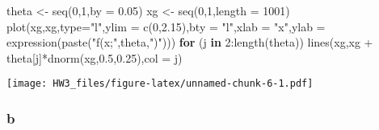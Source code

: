 \documentclass[
]{article}
\newenvironment{Shaded}{\begin{snugshade}}{\end{snugshade}}
\newcommand{\AttributeTok}[1]{\textcolor[rgb]{0.77,0.63,0.00}{#1}}
\newcommand{\ControlFlowTok}[1]{\textcolor[rgb]{0.13,0.29,0.53}{\textbf{#1}}}
\newcommand{\DecValTok}[1]{\textcolor[rgb]{0.00,0.00,0.81}{#1}}
\newcommand{\FloatTok}[1]{\textcolor[rgb]{0.00,0.00,0.81}{#1}}
\newcommand{\FunctionTok}[1]{\textcolor[rgb]{0.00,0.00,0.00}{#1}}
\newcommand{\NormalTok}[1]{#1}
\newcommand{\OtherTok}[1]{\textcolor[rgb]{0.56,0.35,0.01}{#1}}
\newcommand{\SpecialCharTok}[1]{\textcolor[rgb]{0.00,0.00,0.00}{#1}}
\newcommand{\StringTok}[1]{\textcolor[rgb]{0.31,0.60,0.02}{#1}}
\begin{document}
\begin{Shaded}
\begin{Highlighting}[]
\NormalTok{theta }\OtherTok{\textless{}{-}} \FunctionTok{seq}\NormalTok{(}\DecValTok{0}\NormalTok{,}\DecValTok{1}\NormalTok{,}\AttributeTok{by =} \FloatTok{0.05}\NormalTok{)}
\NormalTok{xg }\OtherTok{\textless{}{-}} \FunctionTok{seq}\NormalTok{(}\DecValTok{0}\NormalTok{,}\DecValTok{1}\NormalTok{,}\AttributeTok{length =} \DecValTok{1001}\NormalTok{)}
\FunctionTok{plot}\NormalTok{(xg,xg,}\AttributeTok{type=}\StringTok{"l"}\NormalTok{,}\AttributeTok{ylim =} \FunctionTok{c}\NormalTok{(}\DecValTok{0}\NormalTok{,}\FloatTok{2.15}\NormalTok{),}\AttributeTok{bty =} \StringTok{"l"}\NormalTok{,}\AttributeTok{xlab =} \StringTok{"x"}\NormalTok{,}\AttributeTok{ylab =} \FunctionTok{expression}\NormalTok{(}\FunctionTok{paste}\NormalTok{(}\StringTok{"f(x;"}\NormalTok{,theta,}\StringTok{")"}\NormalTok{)))}
\ControlFlowTok{for}\NormalTok{ (j }\ControlFlowTok{in} \DecValTok{2}\SpecialCharTok{:}\FunctionTok{length}\NormalTok{(theta)) }\FunctionTok{lines}\NormalTok{(xg,xg }\SpecialCharTok{+}\NormalTok{ theta[j]}\SpecialCharTok{*}\FunctionTok{dnorm}\NormalTok{(xg,}\FloatTok{0.5}\NormalTok{,}\FloatTok{0.25}\NormalTok{),}\AttributeTok{col =}\NormalTok{ j)}
\end{Highlighting}
\end{Shaded}

\texttt{[image: HW3\_files/figure-latex/unnamed-chunk-6-1.pdf]}

\hypertarget{b-1}{%
\subsubsection{b}\label{b-1}}
\end{document}
